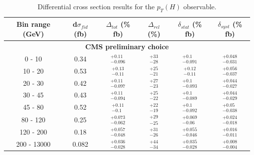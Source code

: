 \begin{table}[!h!tb]
\begin{center}
\small
\caption{
Differential cross section results for the $p_{T}(H)$ observable.
\label{tab:resultspT4l}
}
\begin{tabular}{|c|ccccc|} \hline \hline
Bin range (GeV) & d$\sigma_{fid}$ (fb) & $\Delta_{tot}$ (\% fb) & $\Delta_{rel}$ (\%)  & $\delta_{stat}$ (\% fb)  & $\delta_{syst}$ (\% fb) \\ \hline \hline
\multicolumn{6}{|c|}{ \textbf{CMS preliminary choice }} \\ \hline
        0 - 10 &  0.34 &  $^{+0.11}_{-0.096}$ &  $^{+33}_{-28}$ &  $^{+0.1}_{-0.091}$ &  $^{+0.048}_{-0.031}$ \\ %
  10 - 20 &  0.53 &  $^{+0.13}_{-0.11}$ &  $^{+25}_{-21}$ &  $^{+0.12}_{-0.11}$ &  $^{+0.056}_{-0.037}$ \\ %
  20 - 30 &  0.42 &  $^{+0.11}_{-0.097}$ &  $^{+27}_{-23}$ &  $^{+0.1}_{-0.093}$ &  $^{+0.044}_{-0.027}$ \\ %
  30 - 45 &  0.43 &  $^{+0.11}_{-0.094}$ &  $^{+25}_{-22}$ &  $^{+0.1}_{-0.089}$ &  $^{+0.044}_{-0.029}$ \\ %
  45 - 80 &  0.52 &  $^{+0.11}_{-0.1}$ &  $^{+22}_{-19}$ &  $^{+0.1}_{-0.092}$ &  $^{+0.05}_{-0.038}$ \\ %
  80 - 120 &  0.25 &  $^{+0.073}_{-0.062}$ &  $^{+29}_{-25}$ &  $^{+0.069}_{-0.06}$ &  $^{+0.024}_{-0.018}$ \\ %
  120 - 200 &  0.18 &  $^{+0.057}_{-0.048}$ &  $^{+31}_{-26}$ &  $^{+0.055}_{-0.046}$ &  $^{+0.016}_{-0.011}$ \\ %
  200 - 13000 &  0.082 &  $^{+0.036}_{-0.028}$ &  $^{+44}_{-34}$ &  $^{+0.035}_{-0.028}$ &  $^{+0.008}_{-0.004}$ \\ %


\end{tabular}
\end{center}
\end{table}
